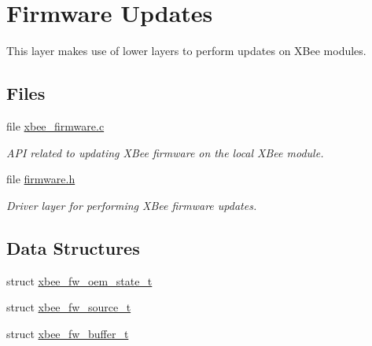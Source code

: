 \hypertarget{group__xbee__firmware}{}\section{Firmware Updates}
\label{group__xbee__firmware}


This layer makes use of lower layers to perform updates on X\+Bee modules.  


\subsection*{Files}
\begin{DoxyCompactItemize}
\item 
file \hyperlink{xbee__firmware_8c}{xbee\+\_\+firmware.\+c}
\begin{DoxyCompactList}\small\item\em A\+PI related to updating X\+Bee firmware on the local X\+Bee module. \end{DoxyCompactList}\item 
file \hyperlink{firmware_8h}{firmware.\+h}
\begin{DoxyCompactList}\small\item\em Driver layer for performing X\+Bee firmware updates. \end{DoxyCompactList}\end{DoxyCompactItemize}
\subsection*{Data Structures}
\begin{DoxyCompactItemize}
\item 
struct \hyperlink{structxbee__fw__oem__state__t}{xbee\+\_\+fw\+\_\+oem\+\_\+state\+\_\+t}
\item 
struct \hyperlink{structxbee__fw__source__t}{xbee\+\_\+fw\+\_\+source\+\_\+t}
\item 
struct \hyperlink{structxbee__fw__buffer__t}{xbee\+\_\+fw\+\_\+buffer\+\_\+t}
\end{DoxyCompactItemize}
